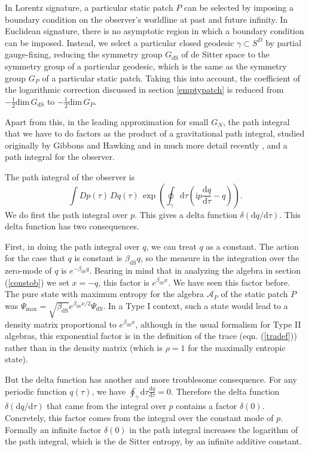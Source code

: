 \documentclass[11pt,a4paper]{article}
\def\dim{{\mathrm{dim}}}
\def\max{{\mathrm{max}}}
\def\be{\begin{equation}}
\def\ee{\end{equation}}
\def\A{{\mathcal A}}
\def\d{{\mathrm d}}
\def\dS{{\mathrm{dS}}}
\def\i{{\mathrm i}}
\begin{document}
In Lorentz signature, a particular static patch $P$ can be selected by imposing a boundary condition on
the observer's worldline at past and future infinity.   In Euclidean signature, there is no asymptotic region
in which a boundary condition can be imposed.   Instead, we select a particular closed geodesic  $\gamma\subset 
S^D$ by partial gauge-fixing, reducing the symmetry group $G_\dS$
of   de Sitter space to the symmetry group of a particular geodesic, which is the same as the symmetry group $G_P$ of a particular static patch.    Taking this into account,
 the coefficient of the logarithmic correction discussed in section \ref{emptypatch} is reduced from $-\frac{1}{2}\dim\,G_\dS$ to $-\frac{1}{2}\dim \,G_P$.

Apart from this, in the leading approximation for small $G_N$, the path integral that we have to do factors as the product of a gravitational path integral,
studied originally by Gibbons and Hawking \cite{GH} and in much more detail recently \cite{Denef}, and a path integral for the observer.

The path integral of the observer is 
\be\label{tombo}\int Dp(\tau)\,Dq(\tau)\,\exp\left(\oint_\gamma \d\tau \left(\i p\frac{\d q}{\d \tau} - q\right)\right). \ee
We do first the  path integral over $p$.  This gives a delta function $\delta(\d q/\d \tau)$.   This delta function has two consequences.

First, in doing the path integral over $q$, we can treat $q$ as a constant.    The action for the case that $q$ is constant is $\beta_\dS q$, so the measure in the integration
over the zero-mode of $q$ is $e^{-\beta_\dS q}$.   Bearing in mind that in analyzing the algebra  in section (\ref{constob}) we set $x=-q$, this factor is $e^{\beta_\dS x}$.   We have seen
this factor  before.   The pure state with maximum entropy for the algebra $\A_P$ of the static patch $P$
was $\Psi_\max =\sqrt{\beta_\dS} e^{\beta_\dS x/2}\Psi_\dS$.   In a Type I context, such a state would lead to a density matrix
proportional to  $e^{\beta_\dS x}$, although in the usual 
formalism for
Type II algebras, this  exponential factor is in the definition of the trace  (eqn. (\ref{tradef})) rather than in the density matrix (which is $\rho=1$ for the 
maximally entropic state).

But the delta function has another and more troublesome consequence.  For any periodic function $q(\tau)$, we have $\oint_\gamma\d \tau \frac{\d q}{\d \tau} =0$.
Therefore the delta function $\delta(\d q/\d\tau)$ that came from the integral over $p$ contains a factor $\delta(0)$.   
Concretely, this factor comes from the integral over the constant mode of $p$.
Formally an infinite factor $\delta(0)$ in the path integral  
 increases the logarithm of the path integral, which is  the de Sitter entropy, by an infinite additive constant.
\end{document}
